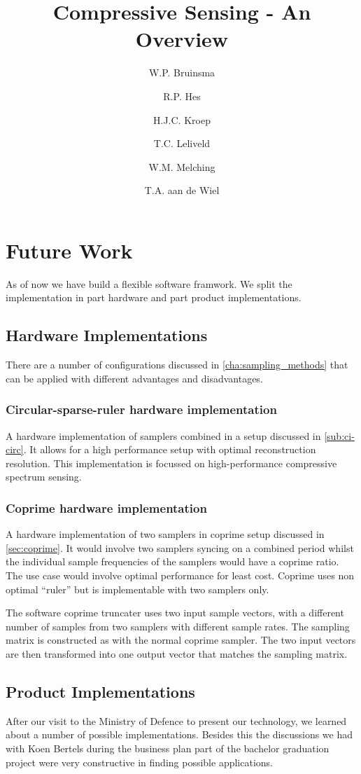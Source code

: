 \documentclass[a4paper, openany, oneside]{memoir}
\title{Compressive Sensing - An Overview}
\author{W.P. Bruinsma \and R.P. Hes \and H.J.C. Kroep \and T.C. Leliveld \and W.M. Melching \and T.A. aan de Wiel}
\begin{document}
\chapter{Future Work}
\label{cha:futurework}
As of now we have build a flexible software framwork. We split the implementation in part hardware and part product implementations.

\section{Hardware Implementations}
\label{sec:hardware_implementations}
There are a number of configurations discussed in \cref{cha:sampling_methods} that can be applied with different advantages and disadvantages.

\subsection{Circular-sparse-ruler hardware implementation}
\label{sub:minimal_sparse_ruler_hardware_implementation}
A hardware implementation of samplers combined in a setup discussed in \cref{sub:ci-circ}. It allows for a high performance setup with optimal reconstruction resolution. This implementation is focussed on high-performance compressive spectrum sensing.

\subsection{Coprime hardware implementation}
\label{sub:coprime_hardwa}
A hardware implementation of two samplers in coprime setup discussed in \cref{sec:coprime}. It would involve two samplers syncing on a combined period whilst the individual sample frequencies of the samplers would have a coprime ratio. The use case would involve optimal performance for least cost. Coprime uses non optimal ``ruler'' but is implementable with two samplers only.

The software coprime truncater uses two input sample vectors, with a different number of samples from two samplers with different sample rates. The sampling matrix is constructed as with the normal coprime sampler. The two input vectors are then transformed into one output vector that matches the sampling matrix.

\section{Product Implementations}
\label{sec:product_implementations}
After our visit to the Ministry of Defence to present our technology, we learned about a number of possible implementations. Besides this the discussions we had with Koen Bertels during the business plan part of the bachelor graduation project were very constructive in finding possible applications.
\end{document}
